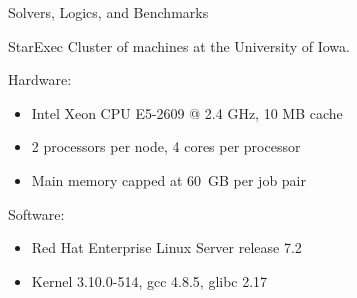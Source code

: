 \documentclass{beamer}
\begin{document}
\begin{frame}{Solvers, Logics, and Benchmarks}
\begin{itemize}
  \end{itemize}

  \vspace{-\smallskipamount}
  
\end{frame}



\begin{frame}{StarExec}
Cluster of machines at the University of Iowa. 

\bigskip

  Hardware:
  \begin{itemize}
  \item Intel Xeon CPU E5-2609 @ 2.4 GHz, 10 MB cache
  \item 2 processors per node, 4 cores per processor
  \item Main memory capped at 60~GB per job pair
  \end{itemize}

  \bigskip

  Software:
  \begin{itemize}
  \item Red Hat Enterprise Linux Server release 7.2
  \item Kernel 3.10.0-514, gcc 4.8.5, glibc 2.17
  \end{itemize}

\end{frame}



\end{document}

